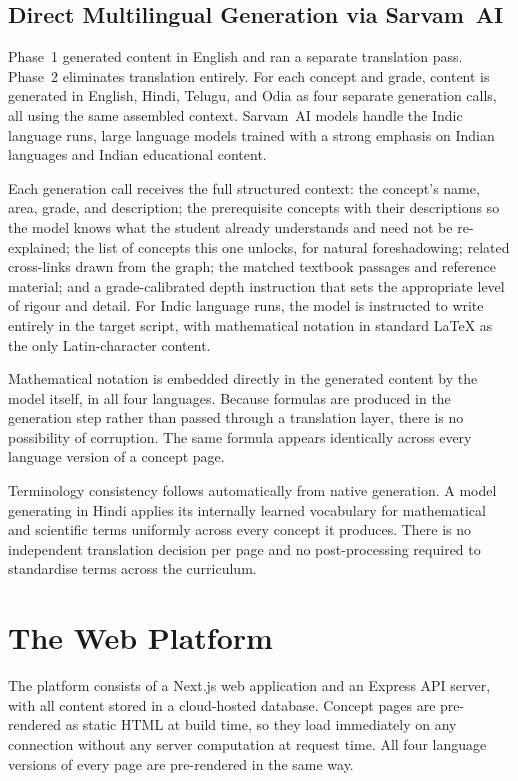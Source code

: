 \documentclass[12pt,a4paper]{article}
\begin{document}
\subsection{Direct Multilingual Generation via Sarvam~AI}

Phase~1 generated content in English and ran a separate translation pass.
Phase~2 eliminates translation entirely.
For each concept and grade, content is generated in English, Hindi, Telugu, and Odia
as four separate generation calls, all using the same assembled context.
Sarvam~AI models handle the Indic language runs, large language models trained with
a strong emphasis on Indian languages and Indian educational content.

Each generation call receives the full structured context:
the concept's name, area, grade, and description;
the prerequisite concepts with their descriptions so the model knows what the student
already understands and need not be re-explained;
the list of concepts this one unlocks, for natural foreshadowing;
related cross-links drawn from the graph;
the matched textbook passages and reference material;
and a grade-calibrated depth instruction that sets the appropriate level of rigour and detail.
For Indic language runs, the model is instructed to write entirely in the target script,
with mathematical notation in standard \LaTeX{} as the only Latin-character content.

Mathematical notation is embedded directly in the generated content by the model itself,
in all four languages.
Because formulas are produced in the generation step rather than passed through
a translation layer, there is no possibility of corruption.
The same formula appears identically across every language version of a concept page.

Terminology consistency follows automatically from native generation.
A model generating in Hindi applies its internally learned vocabulary for
mathematical and scientific terms uniformly across every concept it produces.
There is no independent translation decision per page and no post-processing
required to standardise terms across the curriculum.

\section{The Web Platform}

The platform consists of a Next.js web application and an Express API server,
with all content stored in a cloud-hosted database.
Concept pages are pre-rendered as static HTML at build time,
so they load immediately on any connection without any server computation at request time.
All four language versions of every page are pre-rendered in the same way.
\end{document}
